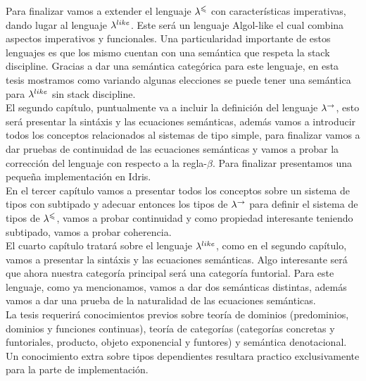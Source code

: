 Para finalizar vamos a extender el lenguaje $\lambda^{\leqslant}$ con caracter\'isticas
imperativas, dando lugar al lenguaje $\lambda^{like}$. Este ser\'a un lenguaje 
Algol-like el cual combina aspectos imperativos y funcionales. Una particularidad
importante de estos lenguajes es que los mismo cuentan con una sem\'antica
que respeta la stack discipline. Gracias a dar una sem\'antica categ\'orica
para este lenguaje, en esta tesis mostramos como variando algunas elecciones
se puede tener una sem\'antica para $\lambda^{like}$ sin stack discipline.\\

El segundo cap\'itulo, puntualmente va a incluir la definici\'on del lenguaje
$\lambda^{\rightarrow}$, esto ser\'a presentar la sint\'axis y las ecuaciones
sem\'anticas, adem\'as vamos a introducir todos los conceptos relacionados al 
sistemas de tipo simple, para finalizar vamos a dar pruebas de
continuidad de las ecuaciones sem\'anticas y vamos a probar la correcci\'on
del lenguaje con respecto a la regla-$\beta$. Para finalizar presentamos
una pequeña implementaci\'on en Idris.\\

En el tercer cap\'itulo vamos a presentar todos los conceptos sobre
un sistema de tipos con subtipado y adecuar entonces los tipos de $\lambda^{\rightarrow}$
para definir el sistema de tipos de $\lambda^{\leqslant}$, vamos a probar
continuidad y como propiedad interesante teniendo subtipado, vamos a probar
coherencia.\\

El cuarto cap\'itulo tratar\'a sobre el lenguaje $\lambda^{like}$, como en el segundo
cap\'itulo, vamos a presentar la sint\'axis y las ecuaciones sem\'anticas. 
Algo interesante ser\'a que ahora nuestra categor\'ia principal ser\'a
una categor\'ia funtorial. Para
este lenguaje, como ya mencionamos, vamos a dar dos sem\'anticas distintas, adem\'as
vamos a dar una prueba de la naturalidad de las ecuaciones sem\'anticas.\\

La tesis requerir\'a conocimientos previos sobre teor\'ia de dominios 
(predominios, dominios y funciones continuas), teor\'ia
de categor\'ias (categor\'ias concretas y funtoriales, producto, 
objeto exponencial y funtores) y sem\'antica denotacional. Un
conocimiento extra sobre tipos dependientes resultara practico exclusivamente
para la parte de implementaci\'on.
